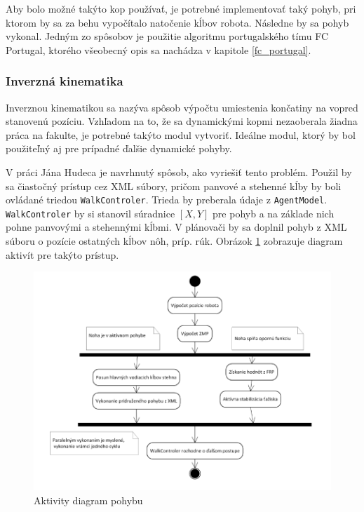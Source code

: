 Aby bolo možné takýto kop používať, je potrebné implementovať taký pohyb, pri ktorom by sa za behu vypočítalo natočenie kĺbov robota. Následne by sa pohyb vykonal. Jedným zo spôsobov je použitie algoritmu portugalského tímu FC Portugal, ktorého všeobecný opis sa nachádza v kapitole \ref{fc_portugal}.

\subsubsection{Inverzná kinematika}

Inverznou kinematikou sa nazýva spôsob výpočtu umiestenia končatiny na vopred stanovenú pozíciu. Vzhľadom na to, že sa dynamickými kopmi nezaoberala žiadna práca na fakulte, je potrebné takýto modul vytvoriť. Ideálne modul, ktorý by bol použiteľný aj pre prípadné ďalšie dynamické pohyby. 

V práci Jána Hudeca\cite{hudec} je navrhnutý spôsob, ako vyriešiť tento problém. Použil by sa čiastočný prístup cez XML súbory, pričom panvové a stehenné kĺby by boli ovládané triedou \texttt{WalkControler}. Trieda by preberala údaje z \texttt{AgentModel}. \texttt{WalkControler} by si stanovil súradnice $[X,Y]$ pre pohyb a na základe nich pohne panvovými a stehennými kĺbmi. V plánovači by sa doplnil pohyb z XML súboru o pozície ostatných kĺbov nôh, príp. rúk. Obrázok \ref{pic_hudec_pohyb_activity_diag} zobrazuje diagram aktivít pre takýto prístup.

\begin{figure}[H]
	\center
	\includegraphics[scale=1]{./data/hudec_pohyb_activity_diag}
	\caption{Aktivity diagram pohybu\cite{hudec}}
	\label{pic_hudec_pohyb_activity_diag}
\end{figure}

